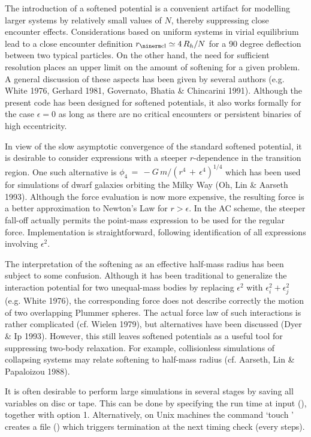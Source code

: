    The introduction of a softened potential is a convenient artifact for
modelling larger systems by relatively small values of $N$, thereby
suppressing close encounter effects.
Considerations based on uniform systems in virial equilibrium lead to a
close encounter definition $r_{\rm cl} \simeq 4 \, R_h / N$ for a 90 degree
deflection between two typical particles.
On the other hand, the need for sufficient resolution places an upper
limit on the amount of softening for a given problem.
A general discussion of these aspects has been given by several authors
(e.g. White 1976, Gerhard 1981, Governato, Bhatia \& Chincarini 1991).
Although the present code has been designed for softened potentials, it
also works formally for the case $\epsilon = 0$ as long as there are no
critical encounters or persistent binaries of high eccentricity.

   In view of the slow asymptotic convergence of the standard softened
potential, it is desirable to consider expressions with a steeper
$r$-dependence in the transition region.
One such alternative is
$\phi_4 \,=\, - G \, m / (r^4 \, + \, \epsilon^4)^{1/4}$
which has been used for simulations of dwarf galaxies orbiting the Milky
Way (Oh, Lin \& Aarseth 1993).
Although the force evaluation is now more expensive,
the resulting force is a better
approximation to Newton's Law for $r > \epsilon$.
In the AC scheme, the steeper fall-off actually permits the point-mass
expression to be used for the regular force.
Implementation is straightforward, following identification of
all expressions involving $\epsilon^2$.

   The interpretation of the softening as an effective half-mass radius has
been subject to some confusion.
Although it has been traditional to generalize the interaction potential for
two unequal-mass bodies by replacing $\epsilon^2$ with
$\epsilon^2_i + \epsilon^2_j$ (e.g. White 1976), the corresponding force
does not describe correctly the motion of two overlapping Plummer spheres.
The actual force law of such interactions is rather complicated
(cf. Wielen 1979), but alternatives have been discussed (Dyer \& Ip 1993).
However, this still leaves softened potentials as a useful tool for
suppressing two-body relaxation.
For example, collisionless simulations of collapsing systems may relate
softening to half-mass radius (cf. Aarseth, Lin \& Papaloizou 1988).


   It is often desirable to perform large
simulations in several stages by saving all  variables on disc
or tape.
This can be done by specifying the run time at input (), together
with option 1.
Alternatively, on Unix machines the command `touch ' creates a file
() which triggers termination at the next timing check
(every  steps).

